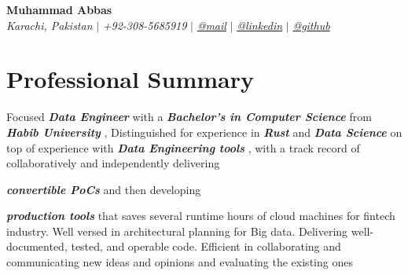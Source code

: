 \documentclass[letterpaper,10pt]{article}
\newcommand{\sectionspace}{
\vspace{-20pt}
}
\newcommand{\highlight}[1]{
  \textsl{\textbf{#1}}
}
\begin{document}

\begin{flushleft}
	\textbf{\large Muhammad Abbas} \\
	\textit{Karachi, Pakistan} $|$
	\textit{+92-308-5685919} $|$
	\href{mailto:abbastaqvi81@gmail.com}{{\textit{@mail}}} $|$
	\href{https://linkedin.com/in/abbastaqvi}{{\textit{@linkedin}}} $|$
	\href{https://github.com/smabbasht}{{\textit{@github}}}
	\vspace{-8pt}
\end{flushleft}


\section{Professional Summary}
\vspace{-3pt}
\begin{itemize}[leftmargin=0.15in, label={}]
	{\item{
            {Focused \highlight{Data Engineer} with a \highlight{Bachelor's in
            Computer Science} from \highlight{Habib University}, Distinguished
            for experience in \highlight{Rust} and \highlight{Data Science} on
            top of experience with \highlight{Data Engineering tools}, with a
            track record of collaboratively and independently delivering
            \highlight{convertible PoCs} and then developing
            \highlight{production tools} that saves several runtime hours of
            cloud machines for fintech industry. Well versed in architectural
            planning for Big data. Delivering well-documented, tested, and
            operable code. Efficient in collaborating and communicating new
            ideas and opinions and evaluating the existing ones}
          \\ 
    }}
\end{itemize}
\sectionspace

\end{document}
